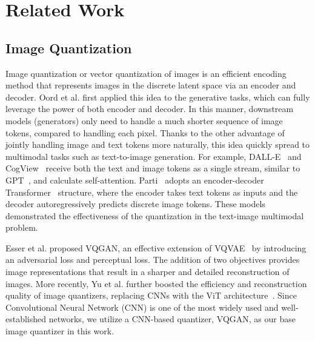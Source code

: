 \documentclass{article}
\begin{document}

\section{Related Work}
\vspace{-1mm}
\label{sec:related_work}

\subsection{Image Quantization}
\vspace{-1mm}

Image quantization or vector quantization of images is an efficient encoding method that represents images in the discrete latent space via an encoder and decoder.
Oord et al. \cite{oord2017neural} first applied this idea to the generative tasks, which can fully leverage the power of both encoder and decoder.
In this manner, downstream models (generators) only need to handle a much shorter sequence of image tokens, compared to handling each pixel.
Thanks to the other advantage of jointly handling image and text tokens more naturally, this idea quickly spread to multimodal tasks such as text-to-image generation.
For example, DALL-E~\cite{ramesh2021zero} and CogView~\cite{ding2021cogview} receive both the text and image tokens as a single stream, similar to GPT~\cite{brown2020language}, and calculate self-attention.
Parti~\cite{yu2022scaling} adopts an encoder-decoder Transformer~\cite{vaswani2017attention} structure, where the encoder takes text tokens as inputs and the decoder autoregressively predicts discrete image tokens.
These models demonstrated the effectiveness of the quantization in the text-image multimodal problem.


Esser et al. \cite{esser2021taming} proposed VQGAN, an effective extension of VQVAE~\cite{oord2017neural} by introducing an adversarial loss and perceptual loss.
The addition of two objectives provides image representations that result in a sharper and detailed reconstruction of images.
More recently, Yu et al. \cite{yu2021vector} further boosted the efficiency and reconstruction quality of image quantizers, replacing CNNs with the ViT architecture~\cite{dosovitskiy2020image}.
Since Convolutional Neural Network (CNN) is one of the most widely used and well-established networks, we utilize a CNN-based quantizer, VQGAN, as our base image quantizer in this work. 


\vspace{-1mm}
\end{document}
